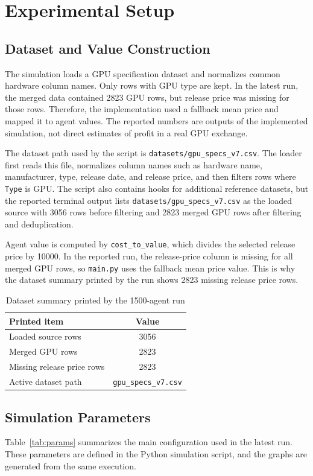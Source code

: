 \documentclass[conference]{IEEEtran}
\begin{document}
\section{Experimental Setup}
\subsection{Dataset and Value Construction}
The simulation loads a GPU specification dataset and normalizes common hardware column names. Only rows with GPU type are kept. In the latest run, the merged data contained 2823 GPU rows, but release price was missing for those rows. Therefore, the implementation used a fallback mean price and mapped it to agent values. The reported numbers are outputs of the implemented simulation, not direct estimates of profit in a real GPU exchange.

The dataset path used by the script is \texttt{datasets/gpu\_specs\_v7.csv}. The loader first reads this file, normalizes column names such as hardware name, manufacturer, type, release date, and release price, and then filters rows where \texttt{Type} is GPU. The script also contains hooks for additional reference datasets, but the reported terminal output lists \texttt{datasets/gpu\_specs\_v7.csv} as the loaded source with 3056 rows before filtering and 2823 merged GPU rows after filtering and deduplication.

Agent value is computed by \texttt{cost\_to\_value}, which divides the selected release price by 10000. In the reported run, the release-price column is missing for all merged GPU rows, so \texttt{main.py} uses the fallback mean price value. This is why the dataset summary printed by the run shows 2823 missing release price rows.

\begin{table}[htbp]
\caption{Dataset summary printed by the 1500-agent run}
\label{tab:dataset}
\centering
\begin{tabular}{lc}
\toprule
\textbf{Printed item} & \textbf{Value} \\
\midrule
Loaded source rows & 3056 \\
Merged GPU rows & 2823 \\
Missing release price rows & 2823 \\
Active dataset path & \texttt{gpu\_specs\_v7.csv} \\
\bottomrule
\end{tabular}
\end{table}

\subsection{Simulation Parameters}
Table~\ref{tab:params} summarizes the main configuration used in the latest run. These parameters are defined in the Python simulation script, and the graphs are generated from the same execution.
\end{document}
